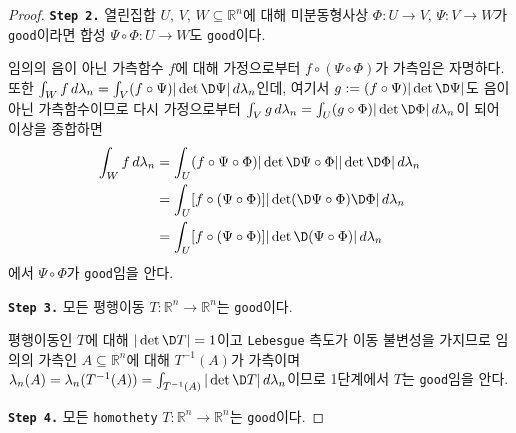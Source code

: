 \begin{proof}
    \noindent\texttt{\textbf{Step 2.}} 열린집합 $U,\,V,\,W\subseteq\mathbb{R}^n$에 대해 미분동형사상 $\Phi:U\to V,\,\Psi:V\to W$가 \texttt{good}이라면 합성 $\Psi\circ\Phi:U\to W$도 \texttt{good}이다.

    임의의 음이 아닌 가측함수 $f$에 대해 가정으로부터 $f\circ(\Psi\circ\Phi)$가 가측임은 자명하다. 또한 $\int_Wf\,d\lambda_n=\int_V(f\circ\Psi)|\det\D\Psi|\,d\lambda_n$인데, 여기서 $g:=(f\circ\Psi)|\det\D\Psi|$도 음이 아닌 가측함수이므로 다시 가정으로부터 $\int_Vg\,d\lambda_n=\int_U(g\circ\Phi)|\det\D\Phi|\,d\lambda_n$이 되어 이상을 종합하면
    \begin{align*}
        \int_Wf\,d\lambda_n&=\int_U(f\circ\Psi\circ\Phi)|\det\D\Psi\circ\Phi||\det\D\Phi|\,d\lambda_n\\
        &=\int_U[f\circ(\Psi\circ\Phi)]|\det(\D\Psi\circ\Phi)\D\Phi|\,d\lambda_n\\
        &=\int_U[f\circ(\Psi\circ\Phi)]|\det\D(\Psi\circ\Phi)|\,d\lambda_n
    \end{align*}
    에서 $\Psi\circ\Phi$가 \texttt{good}임을 안다.

    \noindent\texttt{\textbf{Step 3.}} 모든 평행이동 $T:\mathbb{R}^n\to\mathbb{R}^n$는 \texttt{good}이다.

    평행이동인 $T$에 대해 $|\det\D T|=1$이고 \texttt{Lebesgue} 측도가 이동 불변성을 가지므로 임의의 가측인 $A\subseteq\mathbb{R}^n$에 대해 $T^{-1}(A)$가 가측이며 $\lambda_n(A)=\lambda_n(T^{-1}(A))=\int_{T^{-1}(A)}|\det\D T|\,d\lambda_n$이므로 1단계에서 $T$는 \texttt{good}임을 안다.

    \noindent\texttt{\textbf{Step 4.}} 모든 \texttt{homothety} $T:\mathbb{R}^n\to\mathbb{R}^n$는 \texttt{good}이다.


\end{proof}
